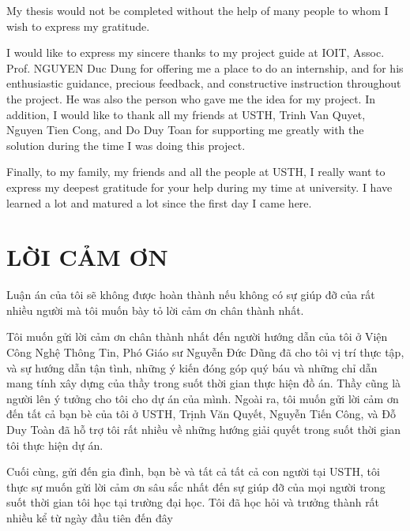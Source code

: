\documentclass{article}
\begin{document}
My thesis would not be completed without the help of many people to whom I wish to express my gratitude.

\vspace{0.5cm}
\noindent I would like to express my sincere thanks to my project guide at IOIT, Assoc. Prof. NGUYEN Duc Dung for offering me a place to do an internship, and for his enthusiastic guidance, precious feedback, and constructive instruction throughout the project. He was also the person who gave me the idea for my project. In addition, I would like to
thank all my friends at USTH, Trinh Van Quyet, Nguyen Tien Cong, and Do Duy Toan for supporting me greatly with the solution during the time I was doing this project.

\vspace{0.5cm}
\noindent Finally, to my family, my friends and all the people at USTH, I really want to express my deepest gratitude for your help during my time at university. I have learned a lot and matured a lot since the first day I came here. 

\vspace{3cm}
\section*{LỜI CẢM ƠN}
\vspace{0.25cm}

Luận án của tôi sẽ không được hoàn thành nếu không có sự giúp đỡ của rất nhiều người mà tôi muốn bày tỏ lời cảm ơn chân thành nhất.

\vspace{0.5cm}
\noindent Tôi muốn gửi lời cảm ơn chân thành nhất đến người hướng dẫn của tôi ở Viện Công Nghệ Thông Tin, Phó Giáo sư Nguyễn Đức Dũng đã cho tôi vị trí thực tập, và sự hướng dẫn tận tình, những ý kiến đóng góp
quý báu và những chỉ dẫn mang tính xây dựng của thầy trong suốt thời gian thực hiện đồ án. Thầy cũng là người lên ý tưởng cho tôi cho dự án của mình. Ngoài ra, tôi muốn gửi lời cảm ơn đến tất cả bạn bè của tôi ở USTH, Trịnh Văn Quyết, Nguyễn Tiến Công, và Đỗ Duy Toàn đã hỗ trợ tôi rất nhiều về những hướng giải quyết trong suốt thời gian tôi thực hiện dự án.

\vspace{0.5cm}
\noindent Cuối cùng, gửi đến gia đình, bạn bè và tất cả tất cả con người tại USTH, tôi thực sự muốn gửi lời cảm ơn sâu sắc nhất đến sự giúp đỡ của mọi người trong suốt thời gian tôi học tại trường đại học. Tôi đã học hỏi và trưởng thành rất nhiều kể từ ngày đầu tiên đến đây
\end{document}
